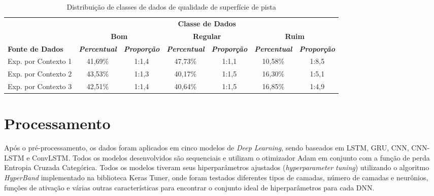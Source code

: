 \begin{table}[h]
\caption{Distribuição de classes de dados de qualidade de superfície de pista}
\label{table:distribuicao_classes_qualidade_superficie}
\centering
\scriptsize
\begin{tabular}{lcccccc}
\cmidrule(l){2-7}
\multicolumn{1}{c}{\multirow{2}{*}{\textbf{}}} & 
\multicolumn{6}{c}{\textbf{Classe de Dados}} \\ \cmidrule(l){2-7} 
\multicolumn{1}{c}{} & 
\multicolumn{2}{c}{\textbf{Bom}} & 
\multicolumn{2}{c}{\textbf{Regular}} & 
\multicolumn{2}{c}{\textbf{Ruim}} \\ \midrule
\textbf{Fonte de Dados} & 
\textit{\textbf{Percentual}} & 
\textit{\textbf{Proporção}} & 
\textit{\textbf{Percentual}} & 
\textit{\textbf{Proporção}} & 
\textit{\textbf{Percentual}} & 
\textit{\textbf{Proporção}} \\ \midrule
Exp. por Contexto 1 & 41,69\% & 1:1,4 & 47,73\% & 1:1,1 & 10,58\% & 1:8,5 \\ \midrule
Exp. por Contexto 2 & 43,53\% & 1:1,3 & 40,17\% & 1:1,5 & 16,30\% & 1:5,1 \\ \midrule
Exp. por Contexto 3 & 42,51\% & 1:1,4 & 40,64\% & 1:1,5 & 16,85\% & 1:4,9 \\ \bottomrule
\end{tabular}
\end{table}

\section{Processamento}

Após o pré-processamento, os dados foram aplicados em cinco modelos de \textit{Deep Learning}, sendo baseados em LSTM, GRU, CNN, CNN-LSTM e ConvLSTM. Todos os modelos desenvolvidos são sequenciais e utilizam o otimizador Adam em conjunto com a função de perda Entropia Cruzada Categórica. Todos os modelos tiveram seus hiperparâmetros ajustados (\textit{hyperparameter tuning}) utilizando o algoritmo \textit{HyperBand} implementado na biblioteca Keras Tuner, onde foram testados diferentes tipos de camadas, número de camadas e neurônios, funções de ativação e várias outras características para encontrar o conjunto ideal de hiperparâmetros para cada DNN. 

